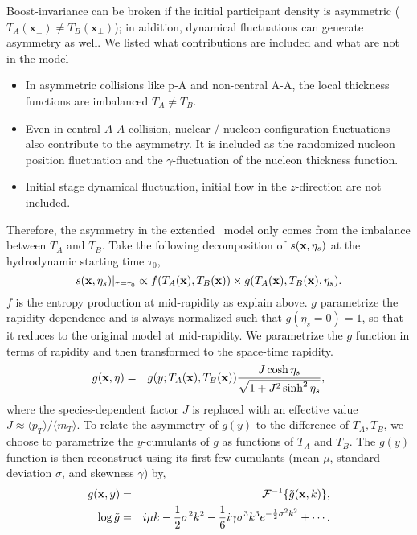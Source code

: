 Boost-invariance can be broken if the initial participant density is asymmetric ($T_A(\mathbf{x}_\perp) \neq T_B(\mathbf{x}_\perp)$); in addition, dynamical fluctuations can generate asymmetry as well.
We listed what contributions are included and what are not in the model
\begin{itemize}
\item In asymmetric collisions like p-A and non-central A-A, the local thickness functions are imbalanced $T_A \neq T_B$.
\item Even in central $A$-$A$ collision, nuclear / nucleon configuration fluctuations also contribute to the asymmetry. It is included as the randomized nucleon position fluctuation and the $\gamma$-fluctuation of the nucleon thickness function.
\item Initial stage dynamical fluctuation, initial flow in the $z$-direction are not included.
\end{itemize}
Therefore, the asymmetry in the extended \trento\ model only comes from the imbalance between $T_A$ and $T_B$.
Take the following decomposition of $s(\mathbf x, \eta_s)$ at the hydrodynamic starting time $\tau_0$,
\begin{equation}
  s(\mathbf x, \eta_s)\vert_{\tau=\tau_0} \propto f(T_A(\mathbf x), T_B(\mathbf x)) \times g(T_A(\mathbf x), T_B(\mathbf x), \eta_s).
  \label{factorized}
\end{equation}
$f$ is the entropy production at mid-rapidity as explain above.
$g$ parametrize the rapidity-dependence and is always normalized such that $g(\eta_s=0)=1$, so that it reduces to the original model at mid-rapidity.
We parametrize the $g$ function in terms of rapidity and then transformed to the space-time rapidity.
\begin{eqnarray}
g(\mathbf x, \eta) &=& g(y; T_A(\mathbf x), T_B(\mathbf x)) \frac{J \cosh \eta_s}{\sqrt{1 + J^2 \sinh^2 \eta_s}},
\label{jacobian}
\end{eqnarray}
where the species-dependent factor $J$ is replaced with an effective value $J \approx \langle p_T \rangle / \langle m_T \rangle$.
To relate the asymmetry of $g(y)$ to the difference of $T_A, T_B$, we choose to parametrize the $y$-cumulants of $g$ as functions of $T_A$ and $T_B$.
The $g(y)$ function is then reconstruct using its first few cumulants (mean $\mu$, standard deviation $\sigma$, and skewness $\gamma$) by,
\begin{eqnarray}
g(\x, y) &=& \mathcal{F}^{-1}\{\tilde{g}(\x, k)\}, \\
\log \tilde{g} &=&  i \mu k - \frac{1}{2}\sigma^2 k^2 - \frac{1}{6} i \gamma \sigma^3 k^3  e^{-\frac{1}{2}\sigma^2 k^2} + \cdots \label{eq:cgf}.
\end{eqnarray}
